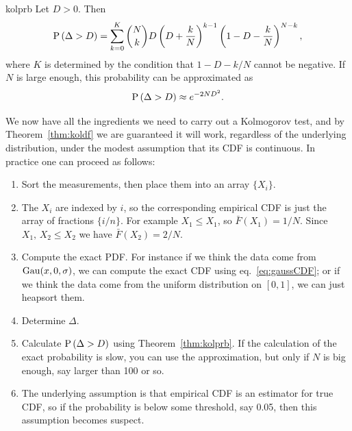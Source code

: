 \begin{theorem}{}{kolprb}
  Let $D>0$. Then
  $$
    \operatorname{P}\left(\Delta>D\right)=\sum_{k=0}^K{N\choose k}D\left(D+\frac{k}{N}\right)^{k-1}
                   \left(1-D-\frac{k}{N}\right)^{N-k},
  $$
  where $K$ is determined by the condition that $1-D-k/N$ cannot be
  negative. If $N$ is large enough, this probability can be approximated as
  $$
    \operatorname{P}\left(\Delta>D\right)\approx e^{-2ND^2}.
  $$
\end{theorem}

We now have all the ingredients we need to carry out a Kolmogorov test,
and by Theorem~\ref{thm:koldf} we are guaranteed it will work, regardless
of the underlying distribution, under the modest assumption that its
CDF is continuous. In practice one can proceed as follows:
\begin{enumerate}
  \item Sort the measurements, then place them into an array $\{X_i\}$.
  \item The $X_i$ are indexed by $i$, so the corresponding empirical CDF 
        is just the array of fractions $\{i/n\}$. For example $X_1\leq X_1$, 
        so $\bar{F}(X_1)=1/N$. Since $X_1,\,X_2\leq X_2$ we have 
        $\bar{F}(X_2)=2/N$.
  \item Compute the exact PDF. For instance if we think the
        data come from $\operatorname{Gau}(x,0,\sigma)$, we can compute the exact CDF
        using eq.~\eqref{eq:gaussCDF}; or if we think the data come from the 
        uniform distribution on $[0,1]$, we can just heapsort them.
  \item Determine $\Delta$.
  \item Calculate $\operatorname{P}\left(\Delta>D\right)$ using Theorem~\ref{thm:kolprb}.
        If the calculation of the exact probability is slow, you can
        use the approximation, but only if $N$ is big enough, say larger
        than 100 or so.
  \item The underlying assumption is that empirical CDF is an estimator
        for true CDF, so if the probability is below some threshold,
        say 0.05, then this assumption becomes suspect. 
\end{enumerate}

